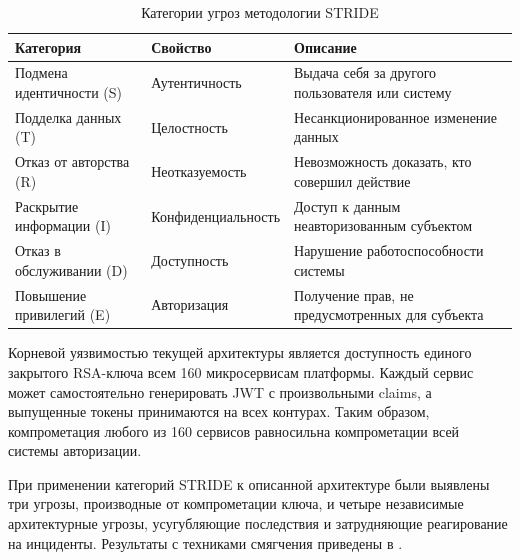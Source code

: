 \begin{table}[h]
  \centering
  \caption{Категории угроз методологии STRIDE}
  \label{tab:stride-categories}
  \begin{tabularx}{\textwidth}{l l X}
    \hline
    \textbf{Категория} & \textbf{Свойство} & \textbf{Описание} \\
    \hline
    Подмена идентичности (S) & Аутентичность & Выдача себя за другого пользователя или систему \\
    Подделка данных (T) & Целостность & Несанкционированное изменение данных \\
    Отказ от авторства (R) & Неотказуемость & Невозможность доказать, кто совершил действие \\
    Раскрытие информации (I) & Конфиденциальность & Доступ к данным неавторизованным субъектом \\
    Отказ в обслуживании (D) & Доступность & Нарушение работоспособности системы \\
    Повышение привилегий (E) & Авторизация & Получение прав, не предусмотренных для субъекта \\
    \hline
  \end{tabularx}
\end{table}

Корневой уязвимостью текущей архитектуры является доступность единого
закрытого RSA-ключа всем 160 микросервисам платформы.
Каждый сервис может самостоятельно генерировать JWT с произвольными claims,
а выпущенные токены принимаются на всех контурах.
Таким образом, компрометация любого из 160 сервисов равносильна
компрометации всей системы авторизации.

При применении категорий STRIDE к описанной архитектуре
были выявлены три угрозы, производные от компрометации ключа,
и четыре независимые архитектурные угрозы, усугубляющие последствия
и затрудняющие реагирование на инциденты.
Результаты с техниками смягчения приведены в .

